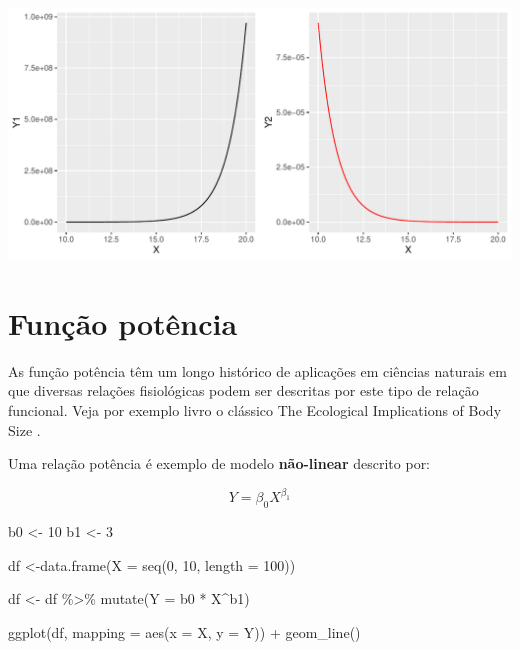 \documentclass[
]{book}
\newenvironment{Shaded}{\begin{snugshade}}{\end{snugshade}}
\newcommand{\AttributeTok}[1]{\textcolor[rgb]{0.77,0.63,0.00}{#1}}
\newcommand{\DecValTok}[1]{\textcolor[rgb]{0.00,0.00,0.81}{#1}}
\newcommand{\FunctionTok}[1]{\textcolor[rgb]{0.00,0.00,0.00}{#1}}
\newcommand{\NormalTok}[1]{#1}
\newcommand{\OtherTok}[1]{\textcolor[rgb]{0.56,0.35,0.01}{#1}}
\newcommand{\SpecialCharTok}[1]{\textcolor[rgb]{0.00,0.00,0.00}{#1}}
\begin{document}
\begin{center}\includegraphics{probest-cambientais_files/figure-latex/unnamed-chunk-221-1} \end{center}

\hypertarget{funuxe7uxe3o-potuxeancia}{%
\section{Função potência}\label{funuxe7uxe3o-potuxeancia}}

As função potência têm um longo histórico de aplicações em ciências naturais em que diversas relações fisiológicas podem ser descritas por este tipo de relação funcional. Veja por exemplo livro o clássico The Ecological Implications of Body Size \citep{peters1986ecological}.

Uma relação potência é exemplo de modelo \textbf{não-linear} descrito por:

\[Y = \beta_{0}X^{\beta_{1}}\]

\begin{Shaded}
\begin{Highlighting}[]
\NormalTok{b0 }\OtherTok{\textless{}{-}} \DecValTok{10}
\NormalTok{b1 }\OtherTok{\textless{}{-}} \DecValTok{3}

\NormalTok{df }\OtherTok{\textless{}{-}}\FunctionTok{data.frame}\NormalTok{(}\AttributeTok{X =} \FunctionTok{seq}\NormalTok{(}\DecValTok{0}\NormalTok{, }\DecValTok{10}\NormalTok{, }\AttributeTok{length =} \DecValTok{100}\NormalTok{))}

\NormalTok{df }\OtherTok{\textless{}{-}}\NormalTok{ df }\SpecialCharTok{\%\textgreater{}\%} \FunctionTok{mutate}\NormalTok{(}\AttributeTok{Y =}\NormalTok{ b0 }\SpecialCharTok{*}\NormalTok{ X}\SpecialCharTok{\^{}}\NormalTok{b1)}

\FunctionTok{ggplot}\NormalTok{(df, }\AttributeTok{mapping =} \FunctionTok{aes}\NormalTok{(}\AttributeTok{x =}\NormalTok{ X, }\AttributeTok{y =}\NormalTok{ Y)) }\SpecialCharTok{+}
  \FunctionTok{geom\_line}\NormalTok{()}
\end{Highlighting}
\end{Shaded}
\end{document}
